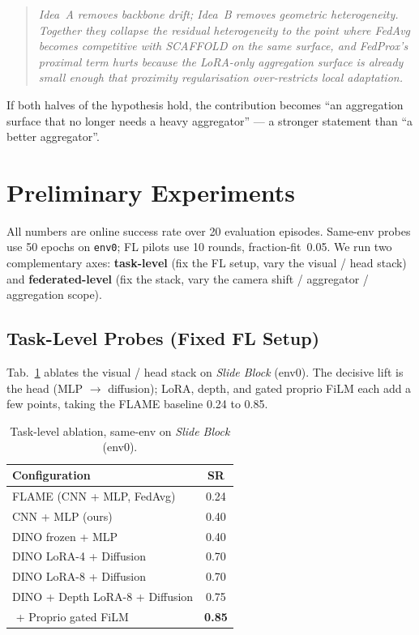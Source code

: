 \documentclass{article}
\begin{document}
\begin{quote}\itshape
Idea~A removes backbone drift; Idea~B removes geometric
heterogeneity. Together they collapse the residual heterogeneity
to the point where FedAvg becomes competitive with SCAFFOLD on
the same surface, and FedProx's proximal term \emph{hurts}
because the LoRA-only aggregation surface is already small enough
that proximity regularisation over-restricts local adaptation.
\end{quote}

If both halves of the hypothesis hold, the contribution becomes
``an aggregation surface that no longer needs a heavy aggregator''
--- a stronger statement than ``a better aggregator''.

\section{Preliminary Experiments}
\label{sec:experiments}

All numbers are online success rate over 20 evaluation episodes.
Same-env probes use 50 epochs on \texttt{env0}; FL pilots use
10 rounds, fraction-fit~0.05. We run two complementary axes:
\textbf{task-level} (fix the FL setup, vary the visual / head
stack) and \textbf{federated-level} (fix the stack, vary the
camera shift / aggregator / aggregation scope).

\subsection{Task-Level Probes (Fixed FL Setup)}
\label{sec:task-probes}
Tab.~\ref{tab:slide-ablation} ablates the visual / head stack on
\emph{Slide Block} (env0). The decisive lift is the head
(MLP $\to$ diffusion); LoRA, depth, and gated proprio FiLM each
add a few points, taking the FLAME baseline 0.24 to 0.85.

\begin{table}[h]
\centering
\small
\caption{Task-level ablation, same-env on \emph{Slide Block}
(env0).}
\label{tab:slide-ablation}
\begin{tabular}{lc}
\toprule
Configuration & SR\\
\midrule
FLAME (CNN + MLP, FedAvg)         & 0.24\\
CNN + MLP (ours)                   & 0.40\\
DINO frozen + MLP                  & 0.40\\
DINO LoRA-4 + Diffusion            & 0.70\\
DINO LoRA-8 + Diffusion            & 0.70\\
DINO + Depth LoRA-8 + Diffusion    & 0.75\\
\,\,+ Proprio gated FiLM           & \textbf{0.85}\\
\bottomrule
\end{tabular}
\end{table}
\end{document}
